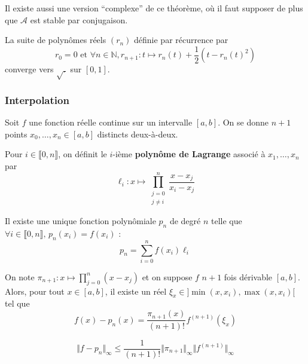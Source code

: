  \begin{remark}
    Il existe aussi une version ``complexe'' de ce théorème, où il faut supposer de plus que $\mathcal{A}$ est stable par conjugaison.
  \end{remark}

  \begin{example}
    La suite de polynômes réels $(r_n)$ définie par récurrence par
    \[ r_0 = 0 \text{ et } \forall n \in \mathbb{N}, r_{n+1} : t \mapsto r_n(t) + \frac{1}{2} (t - r_n(t)^2) \]
    converge vers $\sqrt{.}$ sur $[0,1]$.
  \end{example}

  \subsubsection{Interpolation}


  Soit $f$ une fonction réelle continue sur un intervalle $[a,b]$. On se donne $n+1$ points $x_0, \dots, x_n \in [a,b]$ distincts deux-à-deux.

  \begin{definition}
    Pour $i \in \llbracket 0, n \rrbracket$, on définit le $i$-ième \textbf{polynôme de Lagrange} associé à $x_1, \dots, x_n$ par
    \[ \ell_i : x \mapsto \prod_{\substack{j=0\\j \neq i}}^n \frac{x-x_j}{x_i-x_j} \]
  \end{definition}

  \begin{theorem}
    Il existe une unique fonction polynômiale $p_n$ de degré $n$ telle que $\forall i \in \llbracket 0, n \rrbracket, \, p_n(x_i) = f(x_i)$ :
    \[ p_n = \sum_{i=0}^n f(x_i) \ell_i \]
  \end{theorem}

  \begin{theorem}
    On note $\pi_{n+1} : x \mapsto \prod_{j=0}^{n} (x-x_j)$ et on suppose $f$ $n+1$ fois dérivable $[a,b]$. Alors, pour tout $x \in [a,b]$, il existe un réel $\xi_x \in ]\min(x,x_i),\max(x,x_i)[$ tel que
    \[ f(x)-p_n(x) = \frac{\pi_{n+1}(x)}{(n+1)!} f^{(n+1)}(\xi_x) \]
  \end{theorem}

  \begin{corollary}
    \[ \Vert f - p_n \Vert_\infty \leq \frac{1}{(n+1)!} \Vert \pi_{n+1} \Vert_\infty \Vert f^{(n+1)} \Vert_\infty \]
  \end{corollary}

